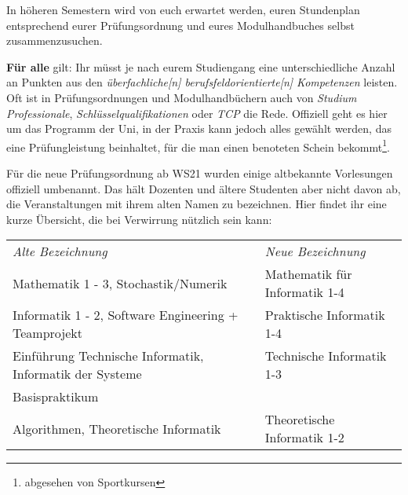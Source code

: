 In höheren Semestern wird von euch erwartet werden, euren Stundenplan
entsprechend eurer Prüfungsordnung und eures Modulhandbuches selbst
zusammenzusuchen. %

\textbf{Für alle} gilt: Ihr müsst je nach eurem Studiengang eine
unterschiedliche Anzahl an Punkten aus den \emph{überfachliche[n]
berufsfeldorientierte[n] Kompetenzen} leisten. Oft ist in Prüfungsordnungen und
Modulhandbüchern auch von \emph{Studium Professionale},
\emph{Schlüsselqualifikationen} oder \emph{TCP} die Rede. Offiziell geht es
hier um das Programm der Uni, in der Praxis kann jedoch alles gewählt werden,
das eine Prüfungleistung beinhaltet, für die man einen benoteten Schein
bekommt\footnote{abgesehen von Sportkursen}.

%

Für die neue Prüfungsordnung ab WS21 wurden einige altbekannte Vorlesungen offiziell umbenannt.
Das hält Dozenten und ältere Studenten aber nicht davon ab, die Veranstaltungen mit
ihrem alten Namen zu bezeichnen. Hier findet ihr eine kurze Übersicht, die bei Verwirrung nützlich sein kann:

\begin{tabular}{ll}
\emph{Alte Bezeichnung}						& \emph{Neue Bezeichnung} \\[.4em]
Mathematik 1 - 3, Stochastik/Numerik	& Mathematik für Informatik 1-4 \\[.4em]
Informatik 1 - 2, Software Engineering + Teamprojekt & Praktische Informatik 1-4\\[.4em]
Einführung Technische Informatik, Informatik der Systeme & Technische Informatik 1-3\\
Basispraktikum & \\[.4em]
Algorithmen, Theoretische Informatik	& Theoretische Informatik 1-2 \\[.4em]
\end{tabular}


